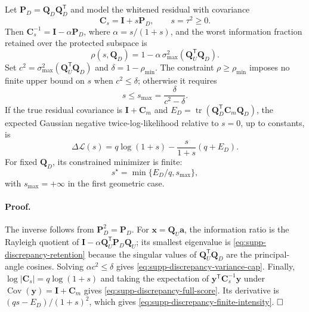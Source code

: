 \begin{theorem}
\label{thm:supp-discrepancy-retention}
Let $\bm P_D=\bm Q_D\bm Q_D^{\mathsf T}$ and model the whitened residual with
covariance
\begin{equation}
 \bm C_s=\bm I+s\bm P_D,\qquad s=\tau^2\ge0.
 \label{eq:supp-discrepancy-covariance}
\end{equation}
Then $\bm C_s^{-1}=\bm I-\alpha\bm P_D$, where
$\alpha=s/(1+s)$, and the worst information fraction retained over the
protected subspace is
\begin{equation}
 \rho(s,\bm Q_D)
 =1-\alpha\,\sigma_{\max}^2(\bm Q_U^{\mathsf T}\bm Q_D).
 \label{eq:supp-discrepancy-retention}
\end{equation}
Set $c^2=\sigma_{\max}^2(\bm Q_U^{\mathsf T}\bm Q_D)$ and
$\delta=1-\rho_{\min}$.  The constraint $\rho\ge\rho_{\min}$ imposes no finite
upper bound on $s$ when $c^2\le\delta$; otherwise it requires
\begin{equation}
 s\le s_{\max}=\frac{\delta}{c^2-\delta}.
 \label{eq:supp-discrepancy-variance-cap}
\end{equation}
If the true residual covariance is $\bm I+\bm C_m$ and
$E_D=\operatorname{tr}(\bm Q_D^{\mathsf T}\bm C_m\bm Q_D)$, the expected
Gaussian negative twice-log-likelihood relative to $s=0$, up to constants, is
\begin{equation}
 \Delta\mathcal L(s)=q\log(1+s)-\frac{s}{1+s}(q+E_D).
 \label{eq:supp-discrepancy-full-score}
\end{equation}
For fixed $\bm Q_D$, its constrained minimizer is finite:
\begin{equation}
 s^\star=\min\{E_D/q,s_{\max}\},
 \label{eq:supp-discrepancy-finite-intensity}
\end{equation}
with $s_{\max}=+\infty$ in the first geometric case.
\end{theorem}

\paragraph{Proof.}
The inverse follows from $\bm P_D^2=\bm P_D$.  For
$\bm x=\bm Q_U\bm a$, the information ratio is the Rayleigh quotient of
$\bm I-\alpha\bm Q_U^{\mathsf T}\bm P_D\bm Q_U$; its smallest eigenvalue is
\eqref{eq:supp-discrepancy-retention} because the singular values of
$\bm Q_U^{\mathsf T}\bm Q_D$ are the principal-angle cosines.  Solving
$\alpha c^2\le\delta$ gives \eqref{eq:supp-discrepancy-variance-cap}.  Finally,
$\log|\bm C_s|=q\log(1+s)$ and taking the expectation of
$\bm y^{\mathsf T}\bm C_s^{-1}\bm y$ under
$\operatorname{Cov}(\bm y)=\bm I+\bm C_m$ gives
\eqref{eq:supp-discrepancy-full-score}.  Its derivative is
$(qs-E_D)/(1+s)^2$, which gives \eqref{eq:supp-discrepancy-finite-intensity}.
$\hfill\square$


